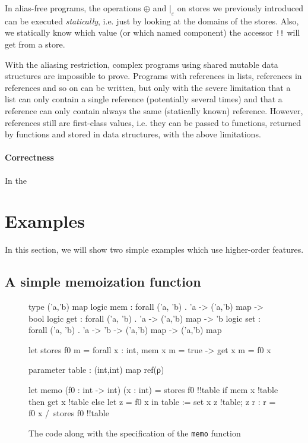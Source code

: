 \documentclass[a4paper]{llncs}
\begin{document}
In alias-free programs, the operations $\oplus$ and $|_ε$ on stores we
previously introduced can be executed {\em statically}, i.e. just by looking
at the domains of the stores. Also, we statically know which value (or which
named component) the accessor {\tt !!} will get from a store. 

With the aliasing restriction, complex programs using shared mutable data
structures are impossible to prove. Programs with references in lists,
references in references and so on can be written, but only with the severe
limitation that a list can only contain a single reference (potentially
several times) and that a reference can only contain always the same
(statically known) reference. However, references still are first-class
values, i.e. they can be passed to functions, returned by functions and stored
in data structures, with the above limitations.

\paragraph{Correctness}

In the 
\section{Examples}
\label{sec:examples}

In this section, we will show two simple examples which use higher-order
features.

\subsection{A simple memoization function}

\begin{figure}[tpb]
\begin{who}
type ('a,'b) map
logic mem : forall ('a, 'b) . 'a -> ('a,'b) map -> bool
logic get : forall ('a, 'b) . 'a -> ('a,'b) map -> 'b
logic set : forall ('a, 'b) . 'a -> 'b -> ('a,'b) map -> ('a,'b) map

let stores f0 m =
  forall x : int, mem x m = true -> get x m = f0 x

parameter table : (int,int) map ref(ρ)

let memo (f0 : int -> int) (x : int) = 
  {stores f0 !!table}
  if mem x !table then get x !table
  else
    let z = f0 x in
    table := set x z !table;
    z
  {r : r = f0 x /\ stores f0 !!table}
\end{who}
  \caption{The code along with the specification of the {\tt memo} function}
  \label{fig:memo}
\end{figure}
\end{document}
